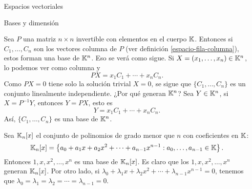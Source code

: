 \begin{chapter}{Espacios vectoriales}
\begin{section}{Bases y dimensi\'on}
 
 \begin{ejemplo*}
     Sea $P$ una matriz $n \times n$ invertible con elementos en el cuerpo $\mathbb K$. Entonces si $C_1,\ldots,C_n$ son los vectores columna de $P$ (ver definición  \ref{espacio-fila-columna}), estos forman una base de $\mathbb K^n$. Eso se verá como sigue. Si $X = (x_1,\ldots,x_n) \in \mathbb K^n$, lo podemos ver como columna y 
     $$
     PX=x_1C_1+\cdots+x_nC_n.
     $$
     Como $PX=0$ tiene solo la solución trivial $X= 0$, se sigue que $\{C_1,\ldots,C_n\}$ es un conjunto linealmente independiente. ¿Por qué generan $\mathbb K^n$? Sea $Y \in \mathbb K^n$, si $X = P^{-1} Y$, entonces $Y = PX$, esto es
     $$
     Y=x_1C_1+\cdots+x_nC_n.
     $$
     Así, $\{C_1,\ldots,C_n\}$ es una base de $\mathbb K^n$.
 \end{ejemplo*}


\begin{ejemplo*}
    Sea $\mathbb K_n[x]$  el conjunto de polinomios de grado menor  que $n$ con coeficientes en $\mathbb K$:
    $$
    \mathbb K_n[x] = \left\{a_0 + a_1 x + a_2x^2+\cdots+a_{n-1}x^{n-1}: a_0,\ldots,a_{n-1} \in \mathbb K  \right\}.
    $$
    Entonces $1,x,x^2,\ldots,x^n$  es una base de $\mathbb K_n[x]$. Es claro que los $1,x,x^2,\ldots,x^n$ generan $\mathbb K_n[x]$. Por otro lado, si  $\lambda_0 + \lambda_1 x + \lambda_2x^2+\cdots+\lambda_{n-1}x^{n-1} =0$, tenemos que $\lambda_0=\lambda_1 = \lambda_2 =\cdots =\lambda_{n-1} =0$.
\end{ejemplo*}


\end{section}
\end{chapter}
